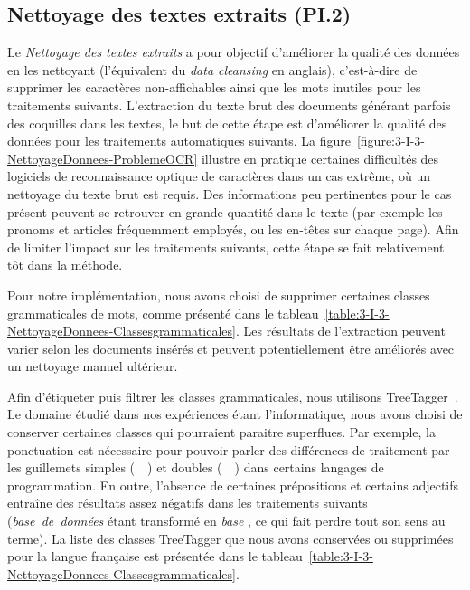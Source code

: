 \subsection{Nettoyage des textes extraits (PI.2)}
\label{subsection:CREA:PI.3-nettoyage}

Le \textit{Nettoyage des textes extraits} a pour objectif d'améliorer la qualité des données en les nettoyant (l'équivalent du \textit{data cleansing} en anglais), c'est-à-dire de supprimer les caractères non-affichables ainsi que les mots inutiles pour les traitements suivants.
L'extraction du texte brut des documents générant parfois des coquilles dans les textes, le but de cette étape est d'améliorer la qualité des données pour les traitements automatiques suivants.
La figure~\ref{figure:3-I-3-NettoyageDonnees-ProblemeOCR} illustre en pratique certaines difficultés des logiciels de reconnaissance optique de caractères dans un cas extrême, où un nettoyage du texte brut est requis.
Des informations peu pertinentes pour le cas présent peuvent se retrouver en grande quantité dans le texte (par exemple les pronoms et articles fréquemment employés, ou les en-têtes sur chaque page).
Afin de limiter l'impact sur les traitements suivants, cette étape se fait relativement tôt dans la méthode.

\bigskip

Pour notre implémentation, nous avons choisi de supprimer certaines classes grammaticales de mots, comme présenté dans le tableau~\ref{table:3-I-3-NettoyageDonnees-Classesgrammaticales}.
Les résultats de l'extraction peuvent varier selon les documents insérés et peuvent potentiellement être améliorés avec un nettoyage manuel ultérieur.

\bigskip

Afin d'étiqueter puis filtrer les classes grammaticales, nous utilisons TreeTagger~\cite{schmid1994probabilistic}\cite{Schmid95improvementsin}.
Le domaine étudié dans nos expériences étant l'informatique, nous avons choisi de conserver certaines classes qui pourraient paraitre superflues.
Par exemple, la ponctuation est nécessaire pour pouvoir parler des différences de traitement par les guillemets simples (~\textquotesingle~) et doubles (~{\tt\textquotedbl}~) dans certains langages de programmation.
En outre, l'absence de certaines prépositions et certains adjectifs entraîne des résultats assez négatifs dans les traitements suivants (\og \textit{base~de~données} \fg étant transformé en \og \textit{base} \fg, ce qui fait perdre tout son sens au terme).
La liste des classes TreeTagger que nous avons conservées ou supprimées pour la langue française est présentée dans le tableau~\ref{table:3-I-3-NettoyageDonnees-Classesgrammaticales}.

